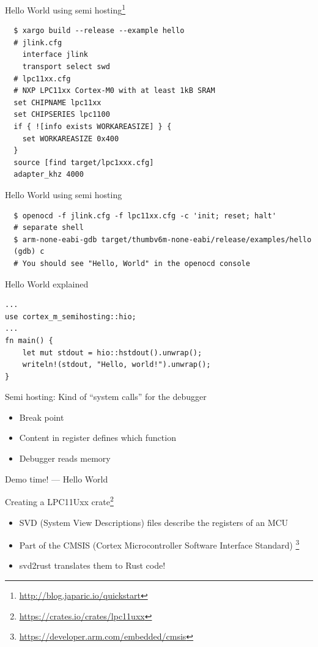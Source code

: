\documentclass[aspectratio=1610,14pt,t]{beamer}
\begin{document}
\begin{frame}[c,fragile]{Hello World using semi hosting\footnote{\url{http://blog.japaric.io/quickstart}}}
  \begin{verbatim}
  $ xargo build --release --example hello
  # jlink.cfg
    interface jlink
    transport select swd
  # lpc11xx.cfg
  # NXP LPC11xx Cortex-M0 with at least 1kB SRAM
  set CHIPNAME lpc11xx
  set CHIPSERIES lpc1100
  if { ![info exists WORKAREASIZE] } {
    set WORKAREASIZE 0x400
  }
  source [find target/lpc1xxx.cfg]
  adapter_khz 4000
  \end{verbatim}
\end{frame}

\begin{frame}[c,fragile]{Hello World using semi hosting}
  \begin{verbatim}
  $ openocd -f jlink.cfg -f lpc11xx.cfg -c 'init; reset; halt'
  # separate shell
  $ arm-none-eabi-gdb target/thumbv6m-none-eabi/release/examples/hello
  (gdb) c
  # You should see "Hello, World" in the openocd console
  \end{verbatim}
\end{frame}

\begin{frame}[c,fragile]{Hello World explained}
  \begin{verbatim}
...
use cortex_m_semihosting::hio;
...
fn main() {
    let mut stdout = hio::hstdout().unwrap();
    writeln!(stdout, "Hello, world!").unwrap();
}
  \end{verbatim}
\pause Semi hosting: Kind of ``system calls'' for the debugger
  \begin{itemize}
    \item Break point
    \item Content in register defines which function
    \item Debugger reads memory
  \end{itemize}
\end{frame}

\begin{frame}[c]{Demo time! --- Hello World}
\end{frame}

\begin{frame}[c,fragile]{Creating a LPC11Uxx crate\footnote{\url{https://crates.io/crates/lpc11uxx}}}
  \begin{itemize}
    \item SVD (System View Descriptions) files describe the registers of an MCU
    \item Part of the CMSIS (Cortex Microcontroller Software Interface Standard)
      \footnote{\url{https://developer.arm.com/embedded/cmsis}}
    \item svd2rust translates them to Rust code!
  \end{itemize}
\end{frame}
\end{document}
